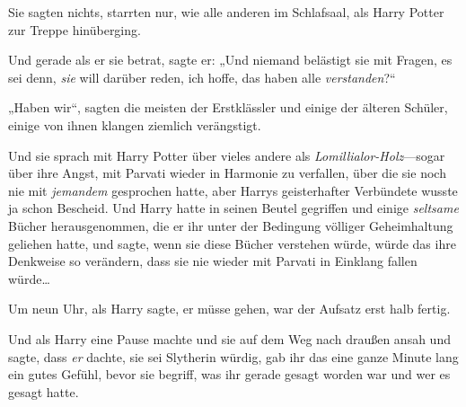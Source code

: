 Sie sagten nichts, starrten nur, wie alle anderen im Schlafsaal, als Harry Potter zur Treppe hinüberging.

Und gerade als er sie betrat, sagte er: „Und niemand belästigt sie mit Fragen, es sei denn, \emph{sie} will darüber reden, ich hoffe, das haben alle \emph{verstanden}?“

„Haben wir“, sagten die meisten der Erstklässler und einige der älteren Schüler, einige von ihnen klangen ziemlich verängstigt.

\later

Und sie sprach mit Harry Potter über vieles andere als \emph{Lomillialor-Holz}—sogar über ihre Angst, mit Parvati wieder in Harmonie zu verfallen, über die sie noch nie mit \emph{jemandem} gesprochen hatte, aber Harrys geisterhafter Verbündete wusste ja schon Bescheid. Und Harry hatte in seinen Beutel gegriffen und einige \emph{seltsame} Bücher herausgenommen, die er ihr unter der Bedingung völliger Geheimhaltung geliehen hatte, und sagte, wenn sie diese Bücher verstehen würde, würde das ihre Denkweise so verändern, dass sie nie wieder mit Parvati in Einklang fallen würde…

Um neun Uhr, als Harry sagte, er müsse gehen, war der Aufsatz erst halb fertig.

Und als Harry eine Pause machte und sie auf dem Weg nach draußen ansah und sagte, dass \emph{er} dachte, sie sei Slytherin würdig, gab ihr das eine ganze Minute lang ein gutes Gefühl, bevor sie begriff, was ihr gerade gesagt worden war und wer es gesagt hatte.

